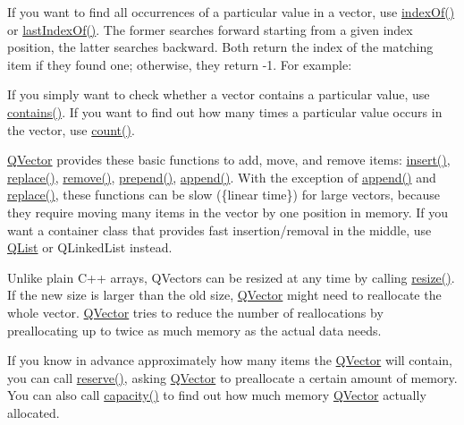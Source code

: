 If you want to find all occurrences of a particular value in a vector, use \hyperlink{class_q_vector_a015c576d25fc9707466b3b301e10f33d}{index\+Of()} or \hyperlink{class_q_vector_a06149e241b9907f6c2b379c4e5279338}{last\+Index\+Of()}. The former searches forward starting from a given index position, the latter searches backward. Both return the index of the matching item if they found one; otherwise, they return -\/1. For example\+:


\begin{DoxyCodeInclude}
\end{DoxyCodeInclude}
 If you simply want to check whether a vector contains a particular value, use \hyperlink{class_q_vector_a048b668c8baf8e2503656a751e73ddad}{contains()}. If you want to find out how many times a particular value occurs in the vector, use \hyperlink{class_q_vector_a0ba5f2f633ab9eb813e6433464f095a6}{count()}.

\hyperlink{class_q_vector}{Q\+Vector} provides these basic functions to add, move, and remove items\+: \hyperlink{class_q_vector_a8567b12d7fa5d23de69ba87e27646ee5}{insert()}, \hyperlink{class_q_vector_a488cf341031679a18361c89111794059}{replace()}, \hyperlink{class_q_vector_a795fabfd2431ce0878ff4ba3c06e7e2b}{remove()}, \hyperlink{class_q_vector_a94da89ec9a0c1b5205065ecf08ec1a7d}{prepend()}, \hyperlink{class_q_vector_ad3536b6c85748f8b0b376d5d9ba0e721}{append()}. With the exception of \hyperlink{class_q_vector_ad3536b6c85748f8b0b376d5d9ba0e721}{append()} and \hyperlink{class_q_vector_a488cf341031679a18361c89111794059}{replace()}, these functions can be slow (\{linear time\}) for large vectors, because they require moving many items in the vector by one position in memory. If you want a container class that provides fast insertion/removal in the middle, use \hyperlink{class_q_list}{Q\+List} or Q\+Linked\+List instead.

Unlike plain C++ arrays, Q\+Vectors can be resized at any time by calling \hyperlink{class_q_vector_a12d291b2dda474720c33a97bfe1b0973}{resize()}. If the new size is larger than the old size, \hyperlink{class_q_vector}{Q\+Vector} might need to reallocate the whole vector. \hyperlink{class_q_vector}{Q\+Vector} tries to reduce the number of reallocations by preallocating up to twice as much memory as the actual data needs.

If you know in advance approximately how many items the \hyperlink{class_q_vector}{Q\+Vector} will contain, you can call \hyperlink{class_q_vector_aab71cce382721d176d1445434ae18e6a}{reserve()}, asking \hyperlink{class_q_vector}{Q\+Vector} to preallocate a certain amount of memory. You can also call \hyperlink{class_q_vector_a160560e2aab0840e0de275ae9ca48f7a}{capacity()} to find out how much memory \hyperlink{class_q_vector}{Q\+Vector} actually allocated.

